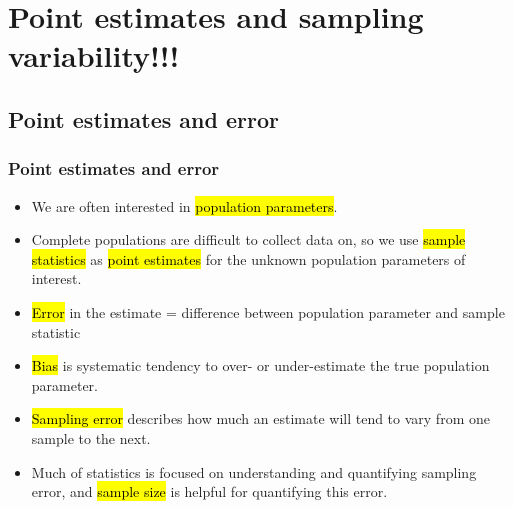 
\section{Point estimates and sampling variability!!!}


\subsection{Point estimates and error}


\begin{frame}
\frametitle{Point estimates and error}

\begin{itemize}

\item We are often interested in \hl{population parameters}.

\item Complete populations are difficult to collect data on, so we use \hl{sample statistics} as \hl{point estimates} for the unknown population parameters of interest.

\item \hl{Error} in the estimate = difference between population parameter and sample statistic

\item \hl{Bias} is systematic tendency to over- or under-estimate the true population parameter.

\item \hl{Sampling error} describes how much an estimate will tend to vary from one sample to the next.

\item Much of statistics is focused on understanding and quantifying sampling error, and \hl{sample size} is helpful for quantifying this error.

\end{itemize}

\end{frame}


\begin{frame}
\frametitle{}


\pause


\end{frame}


